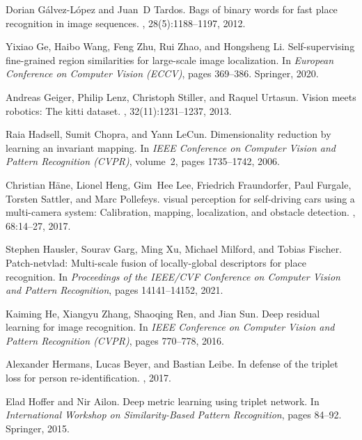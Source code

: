 \documentclass{article}
\begin{document}
\begin{thebibliography}{99}
Dorian G{\'a}lvez-L{\'o}pez and Juan~D Tardos.
\newblock Bags of binary words for fast place recognition in image sequences.
, 28(5):1188--1197, 2012.

Yixiao Ge, Haibo Wang, Feng Zhu, Rui Zhao, and Hongsheng Li.
\newblock Self-supervising fine-grained region similarities for large-scale
  image localization.
\newblock In {\em European Conference on Computer Vision (ECCV)}, pages
  369--386. Springer, 2020.

Andreas Geiger, Philip Lenz, Christoph Stiller, and Raquel Urtasun.
\newblock Vision meets robotics: The kitti dataset.
,
  32(11):1231--1237, 2013.

Raia Hadsell, Sumit Chopra, and Yann LeCun.
\newblock Dimensionality reduction by learning an invariant mapping.
\newblock In {\em IEEE Conference on Computer Vision and Pattern Recognition
  (CVPR)}, volume~2, pages 1735--1742, 2006.

Christian H{\"a}ne, Lionel Heng, Gim~Hee Lee, Friedrich Fraundorfer, Paul
  Furgale, Torsten Sattler, and Marc Pollefeys.
 visual perception for self-driving cars using a multi-camera
  system: Calibration, mapping, localization, and obstacle detection.
, 68:14--27, 2017.

Stephen Hausler, Sourav Garg, Ming Xu, Michael Milford, and Tobias Fischer.
\newblock Patch-netvlad: Multi-scale fusion of locally-global descriptors for
  place recognition.
\newblock In {\em Proceedings of the IEEE/CVF Conference on Computer Vision and
  Pattern Recognition}, pages 14141--14152, 2021.

Kaiming He, Xiangyu Zhang, Shaoqing Ren, and Jian Sun.
\newblock Deep residual learning for image recognition.
\newblock In {\em IEEE Conference on Computer Vision and Pattern Recognition
  (CVPR)}, pages 770--778, 2016.

Alexander Hermans, Lucas Beyer, and Bastian Leibe.
\newblock In defense of the triplet loss for person re-identification.
, 2017.

Elad Hoffer and Nir Ailon.
\newblock Deep metric learning using triplet network.
\newblock In {\em International Workshop on Similarity-Based Pattern
  Recognition}, pages 84--92. Springer, 2015.


\end{thebibliography}
\end{document}
